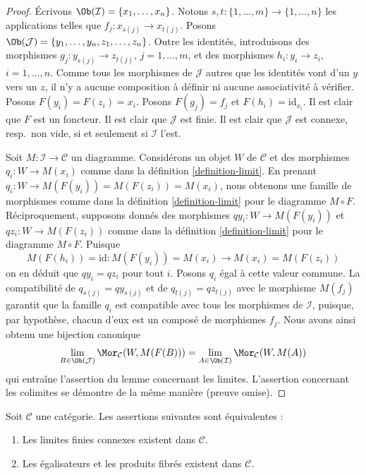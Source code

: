 \begin{proof}
Écrivons $\Ob(\mathcal{I}) = \{x_1, \ldots, x_n\}$.
Notons $s, t : \{1, \ldots, m\} \to \{1, \ldots, n\}$ les applications
telles que $f_j : x_{s(j)} \to x_{t(j)}$.
Posons $\Ob(\mathcal{J}) = \{y_1, \ldots, y_n, z_1, \ldots, z_n\}$.
Outre les identités, introduisons des morphismes
$g_j : y_{s(j)} \to z_{t(j)}$, $j = 1, \ldots, m$, et des morphismes
$h_i : y_i \to z_i$, $i = 1, \ldots, n$. Comme tous les morphismes de
$\mathcal{J}$ autres que les identités vont d'un $y$ vers un $z$, il n'y a
aucune composition à définir ni aucune associativité à vérifier.
Posons $F(y_i) = F(z_i) = x_i$. Posons
$F(g_j) = f_j$ et $F(h_i) = \text{id}_{x_i}$.
Il est clair que $F$ est un foncteur.
Il est clair que $\mathcal{J}$ est finie.
Il est clair que $\mathcal{J}$ est connexe, resp.\ non vide,
si et seulement si $\mathcal{I}$ l'est.

\medskip\noindent
Soit $M : \mathcal{I} \to \mathcal{C}$ un diagramme.
Considérons un objet $W$ de $\mathcal{C}$ et des morphismes
$q_i : W \to M(x_i)$ comme dans la
définition \ref{definition-limit}.
En prenant $q_i : W \to M(F(y_i)) = M(F(z_i)) = M(x_i)$, nous obtenons
une famille de morphismes comme dans la
définition \ref{definition-limit}
pour le diagramme $M \circ F$.
Réciproquement, supposons donnés des morphismes
$qy_i : W \to M(F(y_i))$ et $qz_i : W \to M(F(z_i))$
comme dans la définition \ref{definition-limit}
pour le diagramme $M \circ F$. Puisque
$$
M(F(h_i)) = \text{id} : M(F(y_i)) = M(x_i) \longrightarrow M(x_i) = M(F(z_i))
$$
on en déduit que $qy_i = qz_i$ pour tout $i$. Posons $q_i$ égal à
cette valeur commune. La compatibilité de
$q_{s(j)} = qy_{s(j)}$ et de $q_{t(j)} = qz_{t(j)}$ avec le morphisme
$M(f_j)$ garantit que la famille $q_i$ est compatible avec tous les
morphismes de $\mathcal{I}$, puisque, par hypothèse, chacun d'eux est un
composé de morphismes $f_j$. Nous avons ainsi obtenu une bijection canonique
$$
\lim_{B \in \Ob(\mathcal{J})} \Mor_\mathcal{C}(W, M(F(B)))
=
\lim_{A \in \Ob(\mathcal{I})} \Mor_\mathcal{C}(W, M(A))
$$
qui entraîne l'assertion du lemme concernant les limites. L'assertion
concernant les colimites se démontre de la même manière (preuve omise).
\end{proof}

\begin{lemma}
\label{lemma-fibre-products-equalizers-exist}
Soit $\mathcal{C}$ une catégorie.
Les assertions suivantes sont équivalentes :
\begin{enumerate}
\item Les limites finies connexes existent dans $\mathcal{C}$.
\item Les égalisateurs et les produits fibrés existent dans $\mathcal{C}$.
\end{enumerate}
\end{lemma}

